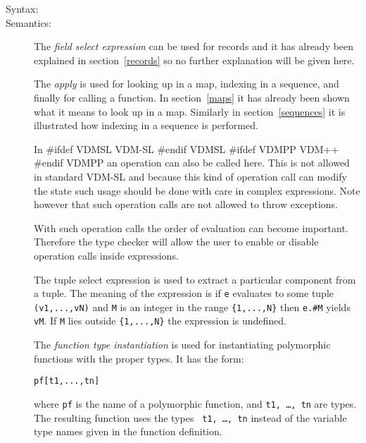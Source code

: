\documentclass[\pformat,12pt]{article}
\newcommand{\vdmslpp}[2]{%
#ifdef VDMSL
#1
#endif VDMSL
#ifdef VDMPP
#2
#endif VDMPP
}
\newcommand{\vdmpp}{VDM++}
\begin{document}
\begin{description}
\item[Syntax:]




    
\item[Semantics:] The {\it field select expression} can be used for records
  and it has already been explained in section~\ref{records} so no further
  explanation will be given here.
     
  The {\it apply} is used for looking up in a map, indexing in a
  sequence, and finally for calling a function. In section~\ref{maps} it
  has already been shown what it means to look up in a map. Similarly in
  section~\ref{sequences} it is illustrated how indexing in a sequence is
  performed.

  In  \vdmslpp{VDM-SL}{\vdmpp} an operation can also be called 
  here. This is not allowed in standard VDM-SL and because this kind of
  operation call can modify the state such usage should be done with
  care in complex expressions. Note however that such operation calls
  are not allowed to throw exceptions.

  With such operation calls the order of evaluation can become
  important. Therefore the type checker will allow the user to enable
  or disable operation calls inside expressions.

  The tuple select expression is used to extract a particular
  component from a tuple. The meaning of the expression is if
  \texttt{e} evaluates to some tuple
  \texttt{(v1,...,vN)} and \texttt{M} is an integer in the
  range \verb+{1,...,N}+ then \texttt{e.\#M} yields \texttt{vM}. If
  \texttt{M} lies outside \verb+{1,...,N}+ the expression is undefined.

  The {\it function type instantiation\/} is used for instantiating
  polymorphic functions with the proper types. It has the form:
  \begin{alltt}
    pf [ t1, ..., tn ]
  \end{alltt}
  where {\tt pf} is the name of a polymorphic function, and {\tt t1,
    \ldots, tn} are types. The resulting function uses the types {\tt
    t1, \ldots, tn} instead of the variable type names given in the
  function definition.


\end{description}
\end{document}
